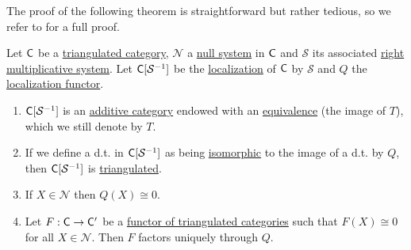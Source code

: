 \documentclass[../../main]{subfiles}
\begin{document}
The proof of the following theorem is straightforward but rather tedious, so we refer to \cite{kashiwaraCategoriesSheaves2006} for a full proof.
\begin{theorem}
  Let \(\mathsf{C}\) be a \hyperref[def:triangulated-category]{triangulated category}, \(\mathcal{N}\) a \hyperref[def:null-system]{null system} in \(\mathsf{C}\) and \(\mathcal{S}\) its associated \hyperref[def:multiplicative-system]{right multiplicative system}.
  Let \(\mathsf{C}[\mathcal{S}^{-1}]\) be the \hyperref[def:localization-category]{localization} of \(\mathsf{C}\) by \(\mathcal{S}\) and \(Q\) the \hyperref[def:localization-category]{localization functor}.
  \begin{enumerate}
    \item \(\mathsf{C}[\mathcal{S}^{-1}]\) is an \hyperref[def:additive-category]{additive category} endowed with an \hyperref[def:equivalent-categories]{equivalence} (the image of \(T\)), which we still denote by \(T\).
    \item If we define a d.t. in \(\mathsf{C}[\mathcal{S}^{-1}]\) as being \hyperref[def:categorical-isomorphism]{isomorphic} to the image of a d.t. by \(Q\), then \(\mathsf{C}[\mathcal{S}^{-1}]\) is \hyperref[def:triangulated-category]{triangulated}.
    \item If \(X \in \mathcal{N}\) then \(Q(X) \cong 0\).
    \item Let \(F: \mathsf{C} \to \mathsf{C'}\) be a \hyperref[def:triangulated-functor]{functor of triangulated categories} such that \(F(X) \cong 0\) for all \(X \in \mathcal{N}\). Then \(F\) factors uniquely through \(Q\).
  \end{enumerate}
\end{theorem}
\end{document}
